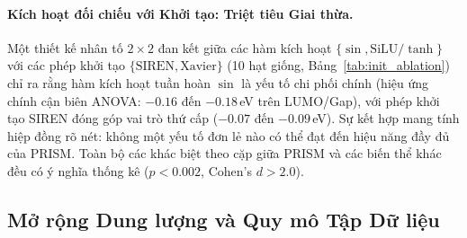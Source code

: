\documentclass[10pt,twocolumn,letterpaper]{article}
\begin{document}
\paragraph{Kích hoạt đối chiếu với Khởi tạo: Triệt tiêu Giai thừa.}
\label{sec:init_ablation}
Một thiết kế nhân tố $2 \times 2$ đan kết giữa các hàm kích hoạt $\{\sin, \mathrm{SiLU}/\tanh\}$ với các phép khởi tạo $\{\text{SIREN}, \text{Xavier}\}$ (10 hạt giống, Bảng~\ref{tab:init_ablation}) chỉ ra rằng hàm kích hoạt tuần hoàn $\sin$ là yếu tố chi phối chính (hiệu ứng chính cận biên ANOVA: $-0.16$ đến $-0.18$\,eV trên LUMO/Gap), với phép khởi tạo SIREN đóng góp vai trò thứ cấp ($-0.07$ đến $-0.09$\,eV). Sự kết hợp mang tính hiệp đồng rõ nét: không một yếu tố đơn lẻ nào có thể đạt đến hiệu năng đầy đủ của PRISM. Toàn bộ các khác biệt theo cặp giữa PRISM và các biến thể khác đều có ý nghĩa thống kê ($p < 0.002$, Cohen's $d > 2.0$).

\begin{table}[h]
\centering
\small
\caption{\textbf{Triệt tiêu Giai thừa $2 \times 2$: Hàm kích hoạt $\times$ Phép khởi tạo} ($N = 1{,}000$, 10 hạt giống). MAE kiểm tra (eV), trung bình $\pm$ độ lệch chuẩn. Toàn bộ bốn mô hình đều có chính xác $2{,}527$ tham số. Hàm kích hoạt tuần hoàn $\sin$ là yếu tố chi phối; khởi tạo SIREN đóng góp phần hiệp đồng thứ cấp. Toàn bộ các khác biệt theo cặp giữa PRISM và các biến thể khác đều có ý nghĩa thống kê ($p < 0.002$, Cohen's $d > 2.0$).}
\label{tab:init_ablation}
\end{table}

\subsection{Mở rộng Dung lượng và Quy mô Tập Dữ liệu}
\label{sec:param_scaling}
\end{document}
